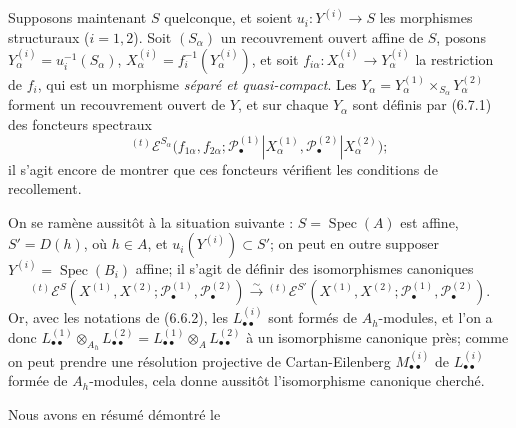 \begin{env}[6.7.2]
Supposons maintenant $S$ quelconque, et soient
$u_i:Y^{(i)}\to S$ les morphismes structuraux ($i=1,2$). Soit $(S_\alpha)$ un
recouvrement ouvert affine de $S$, posons
$Y_\alpha^{(i)}=u_i^{-1}(S_\alpha)$,
$X_\alpha^{(i)}=f_i^{-1}(Y_\alpha^{(i)})$, et soit
$f_{i\alpha}:X_\alpha^{(i)}\to Y_\alpha^{(i)}$ la restriction de $f_i$, qui
est un morphisme \emph{séparé et quasi-compact}. Les
$Y_\alpha=Y_\alpha^{(1)}\times_{S_\alpha}Y_\alpha^{(2)}$ forment un
recouvrement ouvert de $Y$, et sur chaque $Y_\alpha$ sont définis par (6.7.1)
des foncteurs spectraux
\[
  {}^{(t)}\mathscr E^{S_\alpha}
  \bigl(f_{1\alpha},f_{2\alpha};
    \mathscr P_\bullet^{(1)}|X_\alpha^{(1)},
    \mathscr P_\bullet^{(2)}|X_\alpha^{(2)}\bigr);
\]
il s'agit encore de montrer que ces foncteurs vérifient les conditions de
recollement.

On se ramène aussitôt à la situation suivante :
$S=\operatorname{Spec}(A)$ est affine, $S'=D(h)$, où $h\in A$, et
$u_i(Y^{(i)})\subset S'$; on peut en outre supposer
$Y^{(i)}=\operatorname{Spec}(B_i)$ affine; il s'agit de définir des
isomorphismes canoniques
\[
  {}^{(t)}\mathscr E^S
  (X^{(1)},X^{(2)};
   \mathscr P_\bullet^{(1)},\mathscr P_\bullet^{(2)})
  \xrightarrow{\sim}
  {}^{(t)}\mathscr E^{S'}
  (X^{(1)},X^{(2)};
   \mathscr P_\bullet^{(1)},\mathscr P_\bullet^{(2)}).
  \tag{6.7.2.1}\label{III.6.7.2.1.fr}
\]
Or, avec les notations de (6.6.2), les $L_{\bullet\bullet}^{(i)}$ sont formés
de $A_h$-modules, et l'on a donc
$L_{\bullet\bullet}^{(1)}\otimes_{A_h}L_{\bullet\bullet}^{(2)}
=L_{\bullet\bullet}^{(1)}\otimes_A L_{\bullet\bullet}^{(2)}$ à un
isomorphisme canonique près; comme on peut prendre une résolution projective
de Cartan-Eilenberg $M_{\bullet\bullet}^{(i)}$ de
$L_{\bullet\bullet}^{(i)}$ formée de $A_h$-modules, cela donne aussitôt
l'isomorphisme canonique cherché.
\end{env}

Nous avons en résumé démontré le

